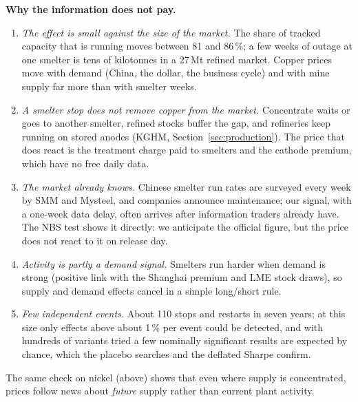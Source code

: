\documentclass[10pt,a4paper]{article}
\begin{document}
\textbf{Why the information does not pay.}
\begin{enumerate}[leftmargin=1.4em]
  \item \emph{The effect is small against the size of the market.} The share of tracked capacity that is running moves between 81 and 86\,\%; a few weeks of outage at one smelter is tens of kilotonnes in a 27\,Mt refined market. Copper prices move with demand (China, the dollar, the business cycle) and with mine supply far more than with smelter weeks.
  \item \emph{A smelter stop does not remove copper from the market.} Concentrate waits or goes to another smelter, refined stocks buffer the gap, and refineries keep running on stored anodes (KGHM, Section~\ref{sec:production}). The price that does react is the treatment charge paid to smelters and the cathode premium, which have no free daily data.
  \item \emph{The market already knows.} Chinese smelter run rates are surveyed every week by SMM and Mysteel, and companies announce maintenance; our signal, with a one-week data delay, often arrives after information traders already have. The NBS test shows it directly: we anticipate the official figure, but the price does not react to it on release day.
  \item \emph{Activity is partly a demand signal.} Smelters run harder when demand is strong (positive link with the Shanghai premium and LME stock draws), so supply and demand effects cancel in a simple long/short rule.
  \item \emph{Few independent events.} About 110 stops and restarts in seven years; at this size only effects above about 1\,\% per event could be detected, and with hundreds of variants tried a few nominally significant results are expected by chance, which the placebo searches and the deflated Sharpe confirm.
\end{enumerate}
The same check on nickel (above) shows that even where supply is concentrated, prices follow news about \emph{future} supply rather than current plant activity.
\end{document}
